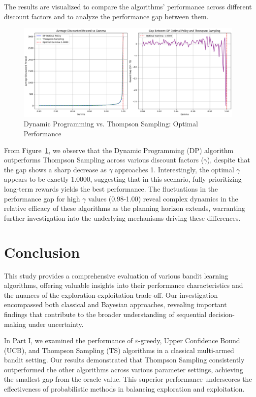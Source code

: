 \documentclass[11pt]{article}
\begin{document}
The results are visualized to compare the algorithms' performance across different discount factors and to analyze the performance gap between them.

\begin{figure}[H]
    \centering
    \includegraphics[width=1\textwidth]{pics/DP_Optimal.png}
    \caption{Dynamic Programming vs. Thompson Sampling: Optimal Performance}
    \label{fig:DP_Optimal}
\end{figure}


From Figure~\ref{fig:DP_Optimal}, we observe that the Dynamic Programming (DP) algorithm outperforms Thompson Sampling across various discount factors ($\gamma$), despite that the gap shows a sharp decrease as $\gamma$ approaches 1. Interestingly, the optimal $\gamma$ appears to be exactly 1.0000, suggesting that in this scenario, fully prioritizing long-term rewards yields the best performance. The fluctuations in the performance gap for high $\gamma$ values (0.98-1.00) reveal complex dynamics in the relative efficacy of these algorithms as the planning horizon extends, warranting further investigation into the underlying mechanisms driving these differences.

\newpage
\section{Conclusion}

This study provides a comprehensive evaluation of various bandit learning algorithms, offering valuable insights into their performance characteristics and the nuances of the exploration-exploitation trade-off. Our investigation encompassed both classical and Bayesian approaches, revealing important findings that contribute to the broader understanding of sequential decision-making under uncertainty.

In Part I, we examined the performance of $\varepsilon$-greedy, Upper Confidence Bound (UCB), and Thompson Sampling (TS) algorithms in a classical multi-armed bandit setting. Our results demonstrated that Thompson Sampling consistently outperformed the other algorithms across various parameter settings, achieving the smallest gap from the oracle value. This superior performance underscores the effectiveness of probabilistic methods in balancing exploration and exploitation.
\end{document}
